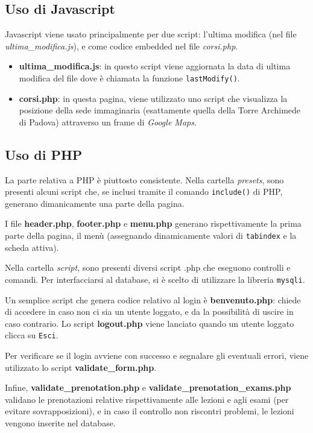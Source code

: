 \documentclass[12pt, a4paper]{article}
\begin{document}
\subsection{Uso di Javascript}
Javascript viene usato principalmente per due script: l'ultima modifica (nel file \textit{ultima\_modifica.js}), e come codice embedded nel file \textit{corsi.php}.
\begin{itemize}
	\item \textbf{ultima\_modifica.js}: in questo script viene aggiornata la data di ultima modifica del file dove è chiamata la funzione \texttt{lastModify()}.
	\item \textbf{corsi.php}: in questa pagina, viene utilizzato uno script che visualizza la posizione della sede immaginaria (esattamente quella della 
	Torre Archimede di Padova) attraverso un frame di \textit{Google Maps}.
\end{itemize}

\subsection{Uso di PHP}
La parte relativa a PHP è piuttosto consistente. Nella cartella \textit{presets}, sono presenti 
alcuni script che, se inclusi tramite il comando \texttt{include()} di PHP, generano dimanicamente
una parte della pagina. \par
\smallskip
I file \textbf{header.php}, \textbf{footer.php} e \textbf{menu.php} generano rispettivamente la prima 
parte della pagina, il menù (assegnando dinamicamente valori di \texttt{tabindex} e la scheda attiva). \par
\smallskip
Nella cartella \textit{script}, sono presenti diversi script .php che eseguono controlli e comandi. Per interfacciarsi al database, si è scelto di utilizzare la libreria \texttt{mysqli}.\par
\smallskip
Un semplice script che genera codice relativo al login è \textbf{benvenuto.php}: chiede di accedere
in caso non ci sia un utente loggato, e da la possibilità di uscire in caso contrario. Lo script \textbf{logout.php} viene lanciato quando un utente loggato clicca su \texttt{Esci}. \par
Per verificare se il login avviene con successo e segnalare
gli eventuali errori, viene utilizzato lo script \textbf{validate\_form.php}. \par
Infine, \mbox{\textbf{validate\_prenotation.php}} e 
\mbox{\textbf{validate\_prenotation\_exams.php}} 
validano le prenotazioni relative rispettivamente alle lezioni e agli esami (per 
evitare sovrapposizioni), e in caso il controllo non riscontri problemi, le lezioni vengono inserite nel database.
\end{document}
